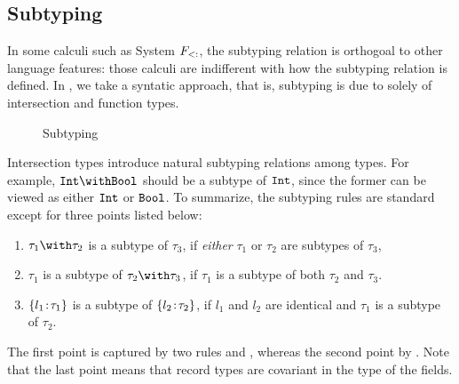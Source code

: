\subsection{Subtyping}




In some calculi such as System $ F_{<:} $, the subtyping relation is
orthogoal to other language features: those calculi are indifferent with how the
subtyping relation is defined. In \name, we take a syntatic approach, that is,
subtyping is due to solely of intersection and function types.

\begin{figure}

\caption{Subtyping}
\end{figure}


Intersection types introduce natural subtyping relations among types. For
example, $ \Int \Intersect \Bool $ should be a subtype of $ \texttt{Int} $, since the
former can be viewed as either $ \texttt{Int} $ or $ \texttt{Bool} $. To summarize, the
subtyping rules are standard except for three points listed below:
\begin{enumerate}
\item $ \tau_1 \Intersect \tau_2 $ is a subtype of $ \tau_3 $, if \emph{either} $ \tau_1 $ or
  $ \tau_2 $ are subtypes of $ \tau_3 $,

\item $ \tau_1 $ is a subtype of $ \tau_2 \Intersect \tau_3 $, if $ \tau_1 $ is a subtype of
  both $ \tau_2 $ and $ \tau_3 $.

\item $ \{ l_1 \!:\! \tau_1 \} $ is a subtype of $ \{ l_2 \!:\! \tau_2 \} $, if
  $ l_1 $ and $ l_2 $ are identical and $ \tau_1 $ is a subtype of $ \tau_2 $.
\end{enumerate}
The first point is captured by two rules  and
, whereas the second point by . Note that the
last point means that record types are covariant in the type of the fields.

